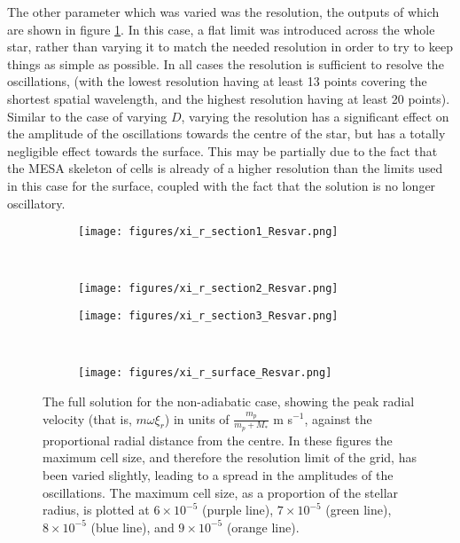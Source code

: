 \documentclass[11pt]{amsart}
\begin{document}
The other parameter which was varied was the resolution, the outputs of which are shown in figure \ref{fig:Resvar}.  In this case, a flat limit was introduced across the whole star, rather than varying it to match the needed resolution in order to try to keep things as simple as possible.  In all cases the resolution is sufficient to resolve the oscillations, (with the lowest resolution having at least 13 points covering the shortest spatial wavelength, and the highest resolution having at least 20 points).  Similar to the case of varying $D$, varying the resolution has a significant effect on the amplitude of the oscillations towards the centre of the star, but has a totally negligible effect towards the surface.  This may be partially due to the fact that the MESA skeleton of cells is already of a higher resolution than the limits used in this case for the surface, coupled with the fact that the solution is no longer oscillatory.




\begin{figure}[htbp]
\begin{center}
\begin{subfigure}{0.5\textwidth}
\texttt{[image: figures/xi\_r\_section1\_Resvar.png]}
\end{subfigure}
~
\begin{subfigure}{0.5\textwidth}
\texttt{[image: figures/xi\_r\_section2\_Resvar.png]}
\end{subfigure}

\begin{subfigure}{0.5\textwidth}
\texttt{[image: figures/xi\_r\_section3\_Resvar.png]}
\end{subfigure}
~
\begin{subfigure}{0.5\textwidth}
\texttt{[image: figures/xi\_r\_surface\_Resvar.png]}
\end{subfigure}

\caption{The full solution for the non-adiabatic case, showing the peak radial velocity (that is, $m \omega \xi_{r}$) in units of $\frac{m_{p}}{m_{p} + M_{*}}$ m s$^{-1}$, against the proportional radial distance from the centre.  In these figures the maximum cell size, and therefore the resolution limit of the grid, has been varied slightly, leading to a spread in the amplitudes of the oscillations.  The maximum cell size, as a proportion of the stellar radius, is plotted at $6 \times 10^{-5}$ (purple line), $7 \times 10^{-5}$ (green line), $8 \times 10^{-5}$ (blue line), and $9 \times 10^{-5}$ (orange line).}
\label{fig:Resvar}
\end{center}
\end{figure}
\end{document}
